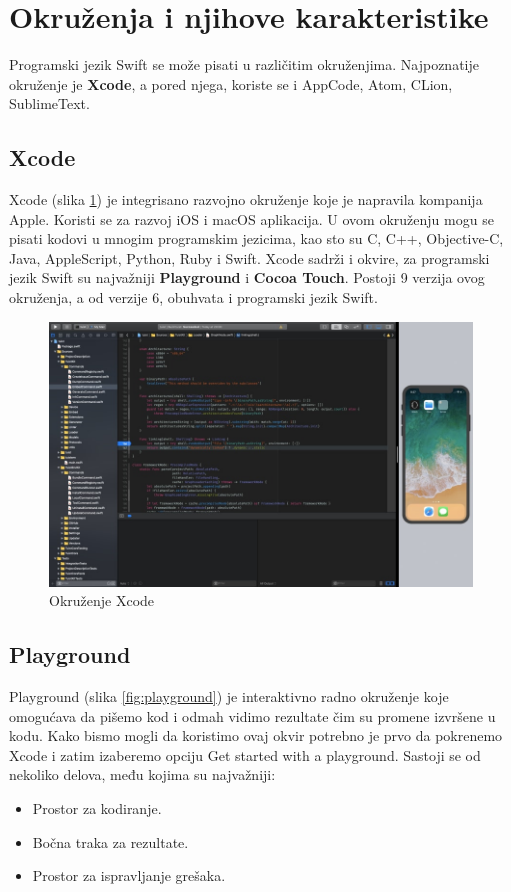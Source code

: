 \documentclass[a4paper]{article}
\begin{document}
\section{Okruženja i njihove karakteristike}	
\label{sec:cetvrtiDeo}
Programski jezik Swift se može pisati u različitim okruženjima. Najpoznatije okruženje je \textbf{Xcode}, a pored njega, koriste se i AppCode, Atom, CLion, SublimeText.

\subsection{Xcode}
\label{subsec:podnaslovXcode}
Xcode (slika \ref{fig:xcode}) je integrisano razvojno okruženje koje je napravila kompanija Apple. Koristi se za razvoj iOS i macOS aplikacija. U ovom okruženju mogu se pisati kodovi u mnogim programskim jezicima, kao sto su C, C++, Objective-C, Java, AppleScript, Python, Ruby i Swift. Xcode sadrži i okvire, za programski jezik Swift su najvažniji \textbf{Playground} i \textbf{Cocoa Touch}. 
Postoji 9 verzija ovog okruženja, a od verzije 6, obuhvata i programski jezik Swift.

\begin{figure}[h!]
\begin{center}
\includegraphics[scale=0.2]{xcode.jpg}
\end{center}
\caption{Okruženje Xcode}
\label{fig:xcode}
\end{figure}


\subsection{Playground}
\label{subsec:podnaslovPlayground}
Playground (slika \ref{fig:playground}) je interaktivno radno okruženje koje omogućava da pišemo kod i odmah vidimo rezultate čim su promene izvršene u kodu. Kako bismo mogli da koristimo ovaj okvir potrebno je prvo da pokrenemo Xcode i zatim izaberemo opciju Get started with a playground.
Sastoji se od nekoliko delova, među kojima su najvažniji: 
\begin{itemize}
\item Prostor za kodiranje.
\item Bočna traka za rezultate.
\item Prostor za ispravljanje grešaka.
\end{itemize}
\end{document}
